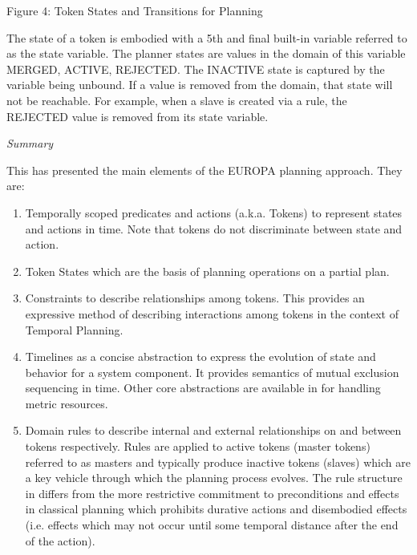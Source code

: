 Figure 4: Token States and Transitions for Planning

The state of a token is embodied with a 5th and final built-in
variable referred to as the state variable. The planner states are
values in the domain of this variable {MERGED, ACTIVE, REJECTED}. The
INACTIVE state is captured by the variable being unbound. If a value
is removed from the domain, that state will not be reachable. For
example, when a slave is created via a rule, the REJECTED value is
removed from its state variable.  

\textit{Summary}

This has presented the main elements of the EUROPA planning approach. They are:

\begin{enumerate}

\item Temporally scoped predicates and actions (a.k.a. Tokens) to represent
states and actions in time. Note that tokens do not discriminate
between state and action. 

\item Token States which are the basis of planning operations on a partial
plan.

\item Constraints to describe relationships among tokens. This provides an
expressive method of describing interactions among tokens in the
context of Temporal Planning.

\item Timelines as a concise abstraction to express the evolution of state
and behavior for a system component. It provides semantics of mutual
exclusion sequencing in time. Other core abstractions are available in
\eu for handling metric resources.

\item Domain rules to describe internal and external relationships on and
between tokens respectively. Rules are applied to active tokens
(master tokens) referred to as masters and typically produce inactive
tokens (slaves) which are a key vehicle through which the planning
process evolves. The rule structure in \eu differs from the more
restrictive commitment to preconditions and effects in classical
planning which prohibits durative actions and disembodied effects
(i.e. effects which may not occur until some temporal distance after
the end of the action).



\end{enumerate}

